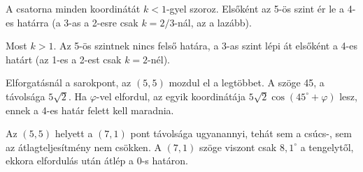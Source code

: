 A csatorna minden koordinátát $k<1$-gyel szoroz. Elsőként az 5-ös szint ér le a 4-es határra (a 3-as a 2-esre csak $k=2/3$-nál, az a lazább).

\begin{center}\end{center}

Most $k>1$. Az 5-ös szintnek nincs felső határa, a 3-as szint lépi át elsőként a 4-es határt (az 1-es a 2-est csak $k=2$-nél).

\begin{center}\end{center}

Elforgatásnál a sarokpont, az $(5,5)$ mozdul el a legtöbbet. A szöge 45\textdegree{}, a távolsága $5\sqrt2$. Ha $\varphi$-vel elfordul, az egyik koordinátája $5\sqrt2\cos(45^{\circ}+\varphi)$ lesz, ennek a 4-es határ felett kell maradnia.

\begin{center}\end{center}

\begin{center}\end{center}

\begin{center}\end{center}

Az $(5,5)$ helyett a $(7,1)$ pont távolsága ugyanannyi, tehát sem a csúcs-, sem az átlagteljesítmény nem csökken. A $(7,1)$ szöge viszont csak $8{,}1^{\circ}$ a tengelytől, ekkora elfordulás után átlép a $0$-s határon.

\begin{center}\end{center}

